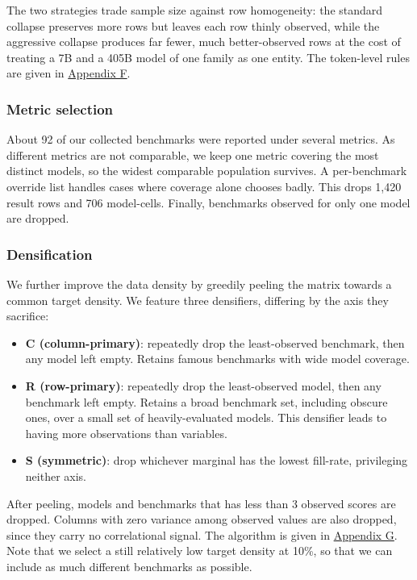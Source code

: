 \documentclass{article} %
\providecommand{\tightlist}{%
  \setlength{\itemsep}{0pt}\setlength{\parskip}{0pt}}
\begin{document}
The two strategies trade sample size against row homogeneity: the standard collapse preserves more rows but leaves each row thinly observed, while the aggressive collapse produces far fewer, much
better-observed rows at the cost of treating a 7B and a 405B model of one family as one entity. The token-level rules are given in \href{Appendix-Methods\#F\%20Model-identity\%20collapse}{Appendix F}.

\hypertarget{metric-selection}{%
\subsubsection{Metric selection}\label{metric-selection}}

About 92 of our collected benchmarks were reported under several metrics. As different metrics are not comparable, we keep one metric covering the most distinct models, so the widest comparable
population survives. A per-benchmark override list handles cases where coverage alone chooses badly. This drops 1,420 result rows and 706 model-cells. Finally, benchmarks observed for only one model
are dropped.

\hypertarget{densification}{%
\subsubsection{Densification}\label{densification}}

We further improve the data density by greedily peeling the matrix towards a common target density. We feature three densifiers, differing by the axis they sacrifice:

\begin{itemize}
\tightlist
\item
  \textbf{C (column-primary)}: repeatedly drop the least-observed benchmark, then any model left empty. Retains famous benchmarks with wide model coverage.
\item
  \textbf{R (row-primary)}: repeatedly drop the least-observed model, then any benchmark left empty. Retains a broad benchmark set, including obscure ones, over a small set of heavily-evaluated
  models. This densifier leads to having more observations than variables.
\item
  \textbf{S (symmetric)}: drop whichever marginal has the lowest fill-rate, privileging neither axis.
\end{itemize}

After peeling, models and benchmarks that has less than 3 observed scores are dropped. Columns with zero variance among observed values are also dropped, since they carry no correlational signal. The
algorithm is given in \href{Appendix-Methods\#G\%20Densification\%20algorithm}{Appendix G}. Note that we select a still relatively low target density at 10\%, so that we can include as much different
benchmarks as possible.
\end{document}
